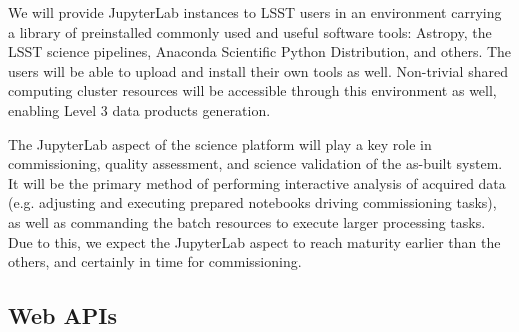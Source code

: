 \documentclass[DM,lsstdraft,toc]{lsstdoc}
\begin{document}
We will provide JupyterLab instances to LSST users in an environment carrying a
library of preinstalled commonly used and useful software tools:
Astropy, the LSST science pipelines, Anaconda Scientific Python Distribution,
and others. The users will be able to upload and install their own tools as well.
Non-trivial shared computing cluster resources will be accessible through this
environment as well, enabling Level 3 data products generation.


The JupyterLab aspect of the science platform will play a key role in commissioning,
quality assessment, and science validation of the as-built system. It will be the primary
method of performing interactive analysis of acquired data (e.g. adjusting and executing
prepared notebooks driving commissioning tasks), as well as commanding
the batch resources to execute larger processing tasks. Due to this, we expect the
JupyterLab aspect to reach maturity earlier than the others, and certainly in time for
commissioning.


\subsection{Web APIs\label{sec:apis}}
\end{document}
